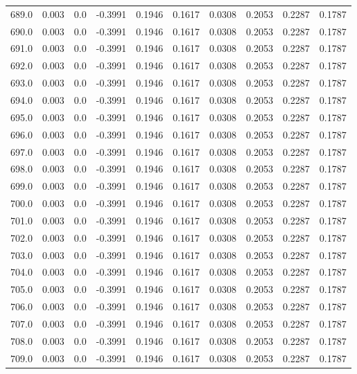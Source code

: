 \begin{longtable}{lrrrrrrrrr}
689.0 & 0.003 & 0.0 & -0.3991 & 0.1946 & 0.1617 & 0.0308 & 0.2053 & 0.2287 & 0.1787 \\
690.0 & 0.003 & 0.0 & -0.3991 & 0.1946 & 0.1617 & 0.0308 & 0.2053 & 0.2287 & 0.1787 \\
691.0 & 0.003 & 0.0 & -0.3991 & 0.1946 & 0.1617 & 0.0308 & 0.2053 & 0.2287 & 0.1787 \\
692.0 & 0.003 & 0.0 & -0.3991 & 0.1946 & 0.1617 & 0.0308 & 0.2053 & 0.2287 & 0.1787 \\
693.0 & 0.003 & 0.0 & -0.3991 & 0.1946 & 0.1617 & 0.0308 & 0.2053 & 0.2287 & 0.1787 \\
694.0 & 0.003 & 0.0 & -0.3991 & 0.1946 & 0.1617 & 0.0308 & 0.2053 & 0.2287 & 0.1787 \\
695.0 & 0.003 & 0.0 & -0.3991 & 0.1946 & 0.1617 & 0.0308 & 0.2053 & 0.2287 & 0.1787 \\
696.0 & 0.003 & 0.0 & -0.3991 & 0.1946 & 0.1617 & 0.0308 & 0.2053 & 0.2287 & 0.1787 \\
697.0 & 0.003 & 0.0 & -0.3991 & 0.1946 & 0.1617 & 0.0308 & 0.2053 & 0.2287 & 0.1787 \\
698.0 & 0.003 & 0.0 & -0.3991 & 0.1946 & 0.1617 & 0.0308 & 0.2053 & 0.2287 & 0.1787 \\
699.0 & 0.003 & 0.0 & -0.3991 & 0.1946 & 0.1617 & 0.0308 & 0.2053 & 0.2287 & 0.1787 \\
700.0 & 0.003 & 0.0 & -0.3991 & 0.1946 & 0.1617 & 0.0308 & 0.2053 & 0.2287 & 0.1787 \\
701.0 & 0.003 & 0.0 & -0.3991 & 0.1946 & 0.1617 & 0.0308 & 0.2053 & 0.2287 & 0.1787 \\
702.0 & 0.003 & 0.0 & -0.3991 & 0.1946 & 0.1617 & 0.0308 & 0.2053 & 0.2287 & 0.1787 \\
703.0 & 0.003 & 0.0 & -0.3991 & 0.1946 & 0.1617 & 0.0308 & 0.2053 & 0.2287 & 0.1787 \\
704.0 & 0.003 & 0.0 & -0.3991 & 0.1946 & 0.1617 & 0.0308 & 0.2053 & 0.2287 & 0.1787 \\
705.0 & 0.003 & 0.0 & -0.3991 & 0.1946 & 0.1617 & 0.0308 & 0.2053 & 0.2287 & 0.1787 \\
706.0 & 0.003 & 0.0 & -0.3991 & 0.1946 & 0.1617 & 0.0308 & 0.2053 & 0.2287 & 0.1787 \\
707.0 & 0.003 & 0.0 & -0.3991 & 0.1946 & 0.1617 & 0.0308 & 0.2053 & 0.2287 & 0.1787 \\
708.0 & 0.003 & 0.0 & -0.3991 & 0.1946 & 0.1617 & 0.0308 & 0.2053 & 0.2287 & 0.1787 \\
709.0 & 0.003 & 0.0 & -0.3991 & 0.1946 & 0.1617 & 0.0308 & 0.2053 & 0.2287 & 0.1787 \\

\end{longtable}
